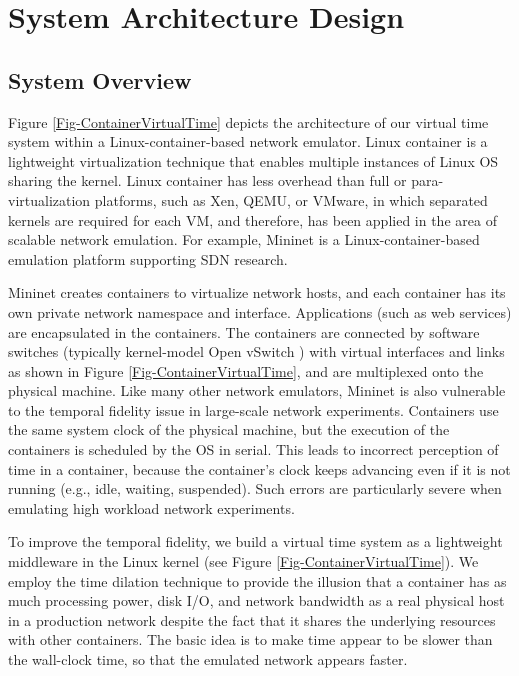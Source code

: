 \section{System Architecture Design}
\label{Sec-Architecture}

\subsection{System Overview}
Figure \ref{Fig-ContainerVirtualTime} depicts the architecture of our virtual time system within a Linux-container-based network emulator. 
Linux container \cite{LXC} is a lightweight virtualization technique that enables multiple instances of Linux OS sharing the kernel. 
Linux container has less overhead than full or para-virtualization platforms, such as Xen, QEMU, or VMware, in which separated kernels are required for each VM, and therefore, has been applied in the area of scalable network emulation. For example, Mininet \cite{Mininet} is a Linux-container-based emulation platform supporting SDN research. 

Mininet creates containers to virtualize network hosts, and each container has its own private network namespace and interface. Applications (such as web services) are encapsulated in the containers. The containers are connected by software switches (typically kernel-model Open vSwitch \cite{OpenvSwitch}) with virtual interfaces and links as shown in Figure \ref{Fig-ContainerVirtualTime}, and are multiplexed onto the physical machine. Like many other network emulators, Mininet is also vulnerable to the temporal fidelity issue in large-scale network experiments. Containers use the same system clock of the physical machine, but the execution of the containers is scheduled by the OS in serial. This leads to incorrect perception of time in a container, because the container's clock keeps advancing even if it is not running (e.g., idle, waiting, suspended). Such errors are particularly severe when emulating high workload network experiments.

To improve the temporal fidelity, we build a virtual time system as a lightweight middleware in the Linux kernel (see Figure \ref{Fig-ContainerVirtualTime}). We employ the time dilation technique to provide the illusion that a container has as much processing power, disk I/O, and network bandwidth as a real physical host in a production network despite the fact that it shares the underlying resources with other containers. The basic idea is to make time appear to be slower than the wall-clock time, so that the emulated network appears faster.

